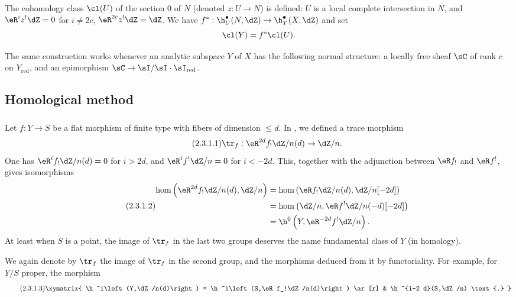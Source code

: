 \documentclass[oneside]{book}
\begin{document}
The cohomology class $\cl(U)$ of the section $0$ of $N$ (denoted
$z:U\to N$) is defined: $U$ is a local complete intersection in $N$, and
$\eR^i z^!\dZ = 0$ for $i\ne 2 c$, $\eR^{2 c} z^!\dZ = \dZ$. We have
$f^*:\h_U^\bullet(N,\dZ) \to \h_Y^\bullet(X,\dZ)$ and set
\[
  \cl(Y) = f^*\cl(U) \text{.}
\]

The same construction works whenever an analytic subspace $Y$ of $X$ has
the following normal structure: a locally free sheaf $\sC$ of rank $c$ on
$Y_\text{red}$, and an epimorphism
$\sC\to \sI/\sI\cdot \sI_\text{red}$.










\subsection{Homological method}\label{IV:2-3}






\subsubsection{}\label{IV:2-3-1}

Let $f:Y\to S$ be a flat morphism of finite type with fibers of dimension
$\leqslant d$. In \cite[XVIII 2.9]{sga4}, we defined a trace morphism
\begin{equation*}\tag{2.3.1.1}\label{IV:eq:2-3-1-1}
  \tr_f:\eR^{2 d} f_! \dZ/n(d) \to \dZ/n \text{.}
\end{equation*}
One has $\eR^i f_!\dZ/n(d)=0$ for $i>2 d$, and
$\eR^i f^!\dZ/n=0$ for $i<-2 d$. This, together with the adjunction between
$\eR f_!$ and $\eR f^!$, gives isomorphisms
\begin{equation*}\tag{2.3.1.2}\label{IV:eq:2-3-1-2}
\begin{aligned}
  \hom\left(\eR^{2 d}f_!\dZ/n(d),\dZ/n\right)
    &= \hom\left(\eR f_!\dZ/n(d),\dZ/n[-2 d]\right) \\
    &= \hom\left(\dZ/n,\eR f^!\dZ/n(-d)[-2 d]\right) \\
    &= \h^0\left(Y,\eR^{-2 d}f^!\dZ/n\right) \text{.}
\end{aligned}
\end{equation*}
At least when $S$ is a point, the image of $\tr_f$ in the last two groups
deserves the name fundamental class of $Y$ (in homology).

We again denote by $\tr_f$ the image of $\tr_f$ in the second group, and the
morphisms deduced from it by functoriality. For example, for $Y/S$ proper,
the morphism
\begin{equation*}\tag{2.3.1.3}\label{IV:eq:2-3-1-3}
\xymatrix{
  \h^i\left(Y,\dZ/n(d)\right) = \h^i\left(S,\eR f_!\dZ/n(d)\right) \ar[r]
    & \h^{i-2 d}(S,\dZ/n) \text{.}
}
\end{equation*}
\end{document}
